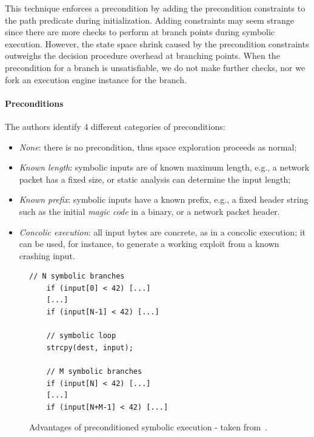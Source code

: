 This technique enforces a precondition by adding the precondition constraints to the path predicate during initialization. Adding constraints may seem strange since there are more checks to perform at branch points during symbolic execution. However, the state space shrink caused by the precondition constraints outweighs the decision procedure overhead at branching points. When the precondition for a branch is unsatisfiable, we do not make further checks, nor we fork an execution engine instance for the branch.%

\paragraph{Preconditions} The authors identify 4 different categories of preconditions:
\begin{itemize}
\item {\em None}: there is no precondition, thus space exploration proceeds as normal;
\item {\em Known length}: symbolic inputs are of known maximum length, e.g., a network packet has a fixed size, or static analysis can determine the input length;
\item {\em Known prefix}: symbolic inputs have a known prefix, e.g., a fixed header string such as the initial {\em magic code} in a binary, or a network packet header.
\item {\em Concolic execution}: all input bytes are concrete, as in a concolic execution; it can be used, for instance, to generate a working exploit from a known crashing input. 
\end{itemize}

\begin{figure}[!ht]
\begin{small}
\begin{lstlisting}[basicstyle=\ttfamily\small]
    // N symbolic branches 
    if (input[0] < 42) [...]
    [...]
    if (input[N-1] < 42) [...]

    // symbolic loop
    strcpy(dest, input); 

    // M symbolic branches
    if (input[N] < 42) [...]
    [...]
    if (input[N+M-1] < 42) [...]
\end{lstlisting}
\end{small}
\caption{\label{fig:preconditioned} Advantages of preconditioned symbolic execution - taken from~\protect\cite{AEG-NDSS11}.}
\end{figure}

